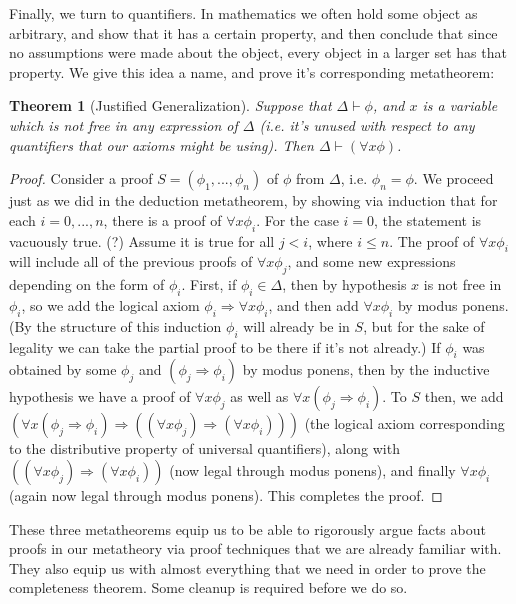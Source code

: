 \documentclass{article}
\theoremstyle{definition}
\theoremstyle{plain}
\theoremstyle{theorem}
\newtheorem{theorem}{Theorem}[section]
\begin{document}
Finally, we turn to quantifiers. In mathematics we often hold some object as arbitrary, and show that it has a certain property, and then conclude that since no assumptions were made about the object, every object in a larger set has that property. We give this idea a name, and prove it's corresponding metatheorem:
\begin{theorem}[Justified Generalization]
    Suppose that $\Delta \vdash \phi$, and $x$ is a variable which is not free in any expression of $\Delta$ (i.e. it's unused with respect to any quantifiers that our axioms might be using). Then $\Delta \vdash (\forall x \phi)$. 
\end{theorem}
\begin{proof}
    Consider a proof $S = (\phi_1,...,\phi_n)$ of $\phi$ from $\Delta$, i.e. $\phi_n = \phi$. We proceed just as we did in the deduction metatheorem, by showing via induction that for each $i = 0,...,n$, there is a proof of $\forall x \phi_i$. For the case $i=0$, the statement is vacuously true. (?) Assume it is true for all $j<i$, where $i \leq n$. The proof of $\forall x \phi_i$ will include all of the previous proofs of $\forall x \phi_j$, and some new expressions depending on the form of $\phi_i$. First, if $\phi_i \in \Delta$, then by hypothesis $x$ is not free in $\phi_i$, so we add the logical axiom $\phi_i \Rightarrow \forall x \phi_i$, and then add $\forall x \phi_i$ by modus ponens. (By the structure of this induction $\phi_i$ will already be in $S$, but for the sake of legality we can take the partial proof to be there if it's not already.) If $\phi_i$ was obtained by some $\phi_j$ and $(\phi_j \Rightarrow \phi_i)$ by modus ponens, then by the inductive hypothesis we have a proof of $\forall x \phi_j$ as well as $\forall x (\phi_j \Rightarrow \phi_i)$. To $S$ then, we add $(\forall x (\phi_j \Rightarrow \phi_i) \Rightarrow ((\forall x \phi_j) \Rightarrow (\forall x \phi_i)))$ (the logical axiom corresponding to the distributive property of universal quantifiers),  along with $((\forall x \phi_j) \Rightarrow (\forall x \phi_i))$ (now legal through modus ponens), and finally $\forall x \phi_i$ (again now legal through modus ponens). This completes the proof.
\end{proof}
These three metatheorems equip us to be able to rigorously argue facts about proofs in our metatheory via proof techniques that we are already familiar with. They also equip us with almost everything that we need in order to prove the completeness theorem. Some cleanup is required before we do so.
\end{document}

